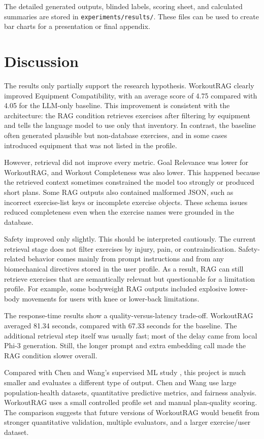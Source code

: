 \documentclass[12pt]{article}
\begin{document}
The detailed generated outputs, blinded labels, scoring sheet, and calculated summaries are stored in \texttt{experiments/results/}. These files can be used to create bar charts for a presentation or final appendix.

\section{Discussion}
The results only partially support the research hypothesis. WorkoutRAG clearly improved Equipment Compatibility, with an average score of 4.75 compared with 4.05 for the LLM-only baseline. This improvement is consistent with the architecture: the RAG condition retrieves exercises after filtering by equipment and tells the language model to use only that inventory. In contrast, the baseline often generated plausible but non-database exercises, and in some cases introduced equipment that was not listed in the profile.

However, retrieval did not improve every metric. Goal Relevance was lower for WorkoutRAG, and Workout Completeness was also lower. This happened because the retrieved context sometimes constrained the model too strongly or produced short plans. Some RAG outputs also contained malformed JSON, such as incorrect exercise-list keys or incomplete exercise objects. These schema issues reduced completeness even when the exercise names were grounded in the database.

Safety improved only slightly. This should be interpreted cautiously. The current retrieval stage does not filter exercises by injury, pain, or contraindication. Safety-related behavior comes mainly from prompt instructions and from any biomechanical directives stored in the user profile. As a result, RAG can still retrieve exercises that are semantically relevant but questionable for a limitation profile. For example, some bodyweight RAG outputs included explosive lower-body movements for users with knee or lower-back limitations.

The response-time results show a quality-versus-latency trade-off. WorkoutRAG averaged 81.34 seconds, compared with 67.33 seconds for the baseline. The additional retrieval step itself was usually fast; most of the delay came from local Phi-3 generation. Still, the longer prompt and extra embedding call made the RAG condition slower overall.

Compared with Chen and Wang's supervised ML study \cite{chen2025personalized}, this project is much smaller and evaluates a different type of output. Chen and Wang use large population-health datasets, quantitative predictive metrics, and fairness analysis. WorkoutRAG uses a small controlled profile set and manual plan-quality scoring. The comparison suggests that future versions of WorkoutRAG would benefit from stronger quantitative validation, multiple evaluators, and a larger exercise/user dataset.
\end{document}
